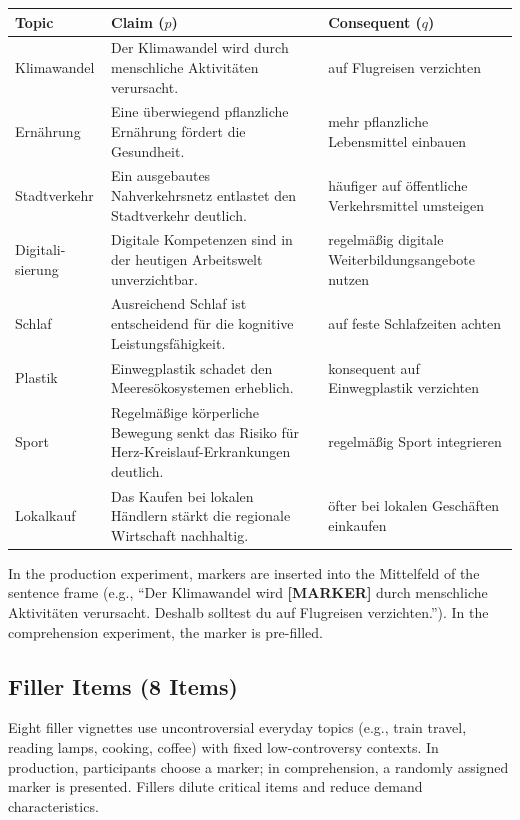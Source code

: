 \documentclass[12pt]{article}
\begin{document}
\begin{longtable}{p{1.8cm} p{5cm} p{5.5cm}}
\toprule
\textbf{Topic} & \textbf{Claim ($p$)} & \textbf{Consequent ($q$)} \\
\midrule
\endhead
Klimawandel & Der Klimawandel wird durch menschliche Aktivit\"aten verursacht. & auf Flugreisen verzichten \\
\addlinespace
Ern\"ahrung & Eine \"uberwiegend pflanzliche Ern\"ahrung f\"ordert die Gesundheit. & mehr pflanzliche Lebensmittel einbauen \\
\addlinespace
Stadtverkehr & Ein ausgebautes Nahverkehrsnetz entlastet den Stadtverkehr deutlich. & h\"aufiger auf \"offentliche Verkehrsmittel umsteigen \\
\addlinespace
Digitali-sierung & Digitale Kompetenzen sind in der heutigen Arbeitswelt unverzichtbar. & regelm\"a\ss ig digitale Weiterbildungsangebote nutzen \\
\addlinespace
Schlaf & Ausreichend Schlaf ist entscheidend f\"ur die kognitive Leistungsf\"ahigkeit. & auf feste Schlafzeiten achten \\
\addlinespace
Plastik & Einwegplastik schadet den Meeres\"okosystemen erheblich. & konsequent auf Einwegplastik verzichten \\
\addlinespace
Sport & Regelm\"a\ss ige k\"orperliche Bewegung senkt das Risiko f\"ur Herz-Kreislauf-Erkrankungen deutlich. & regelm\"a\ss ig Sport integrieren \\
\addlinespace
Lokalkauf & Das Kaufen bei lokalen H\"andlern st\"arkt die regionale Wirtschaft nachhaltig. & \"ofter bei lokalen Gesch\"aften einkaufen \\
\bottomrule
\end{longtable}

In the production experiment, markers are inserted into the Mittelfeld of the sentence frame (e.g., ``Der Klimawandel wird \textbf{[MARKER]} durch menschliche Aktivit\"aten verursacht. Deshalb solltest du auf Flugreisen verzichten.''). In the comprehension experiment, the marker is pre-filled.

\subsection{Filler Items (8 Items)}

Eight filler vignettes use uncontroversial everyday topics (e.g., train travel, reading lamps, cooking, coffee) with fixed low-controversy contexts. In production, participants choose a marker; in comprehension, a randomly assigned marker is presented. Fillers dilute critical items and reduce demand characteristics.
\end{document}

